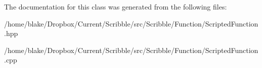 The documentation for this class was generated from the following files\-:\begin{DoxyCompactItemize}
\item 
/home/blake/\-Dropbox/\-Current/\-Scribble/src/\-Scribble/\-Function/Scripted\-Function.\-hpp\item 
/home/blake/\-Dropbox/\-Current/\-Scribble/src/\-Scribble/\-Function/Scripted\-Function.\-cpp\end{DoxyCompactItemize}
